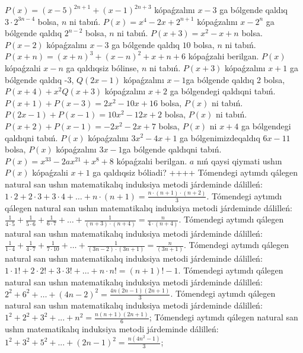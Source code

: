 \(P(x) = (x - 5)^{2n + 1} + (x - 1)^{2n + 3}\) kópaǵzalını \(x - 3\) ga bólgende qaldıq \(3 \cdot 2^{3n - 4}\) bolsa, \(n\) ni tabıń.
\(P(x) = x^{4} - 2x + 2^{n + 1}\) kópaǵzalını \(x - 2^{n}\) ga bólgende qaldıq \(2^{n - 2}\) bolsa, \(n\) ni tabıń.
\(P(x + 3) = x^{2} - x + n\) bolsa. \(P(x - 2)\) kópaǵzalını \(x - 3\) ga bólgende qaldıq \(10\) bolsa, \(n\) ni tabıń.
\(P(x + n) = (x + n)^{3} + (x - n)^{2} + x + n + 6\) kópaǵzalıi berilgan. \(P(x)\) kópaǵzalıi \(x - n\) ga qaldıqsiz bólinse, \(n\) ni tabıń.
\(P(x + 3)\) kópaǵzalını \(x + 1\) ga bólgende qaldıq -3, \(Q(2x - 1)\) kópaǵzalını \(x - 1\)ga bólgende qaldıq 2 bolsa, \(P(x + 4) + x^{2}Q(x + 3)\) kópaǵzalını \(x + 2\) ga bólgendegi qaldıqni tabıń.
\(P(x + 1) + P(x - 3) = 2x^{2} - 10x + 16\) bolsa, \(P(x)\) ni tabıń.
\(P(2x - 1) + P(x - 1) = 10x^{2} - 12x + 2\) bolsa, \(P(x)\) ni tabıń.
\(P(x + 2) + P(x - 1) = - 2x^{2} - 2x + 7\) bolsa, \(P(x)\) ni \(x + 4\) ga bólgendegi qaldıqni tabıń.
\(P(x)\) kópaǵzalını \(3x^{2} - 4x + 1\) ga bólgenimizdeqaldıq \(6x - 11\) bolsa, \(P(x)\) kópaǵzalını \(3x - 1\)ga bólgende qaldıqni tabıń.
\(P(x) = x^{33} - 2ax^{21} + x^{8} + 8\) kópaǵzalıi berilgan. \(a\) nıń qaysi qiymati ushın \(P(x)\) kópaǵzalıi \(x + 1\) ga qaldıqsiz bóliadi?
++++
Tómendegi aytımdı qálegen natural san ushın matematikalıq induksiya metodi járdeminde dálilleń: \(1 \cdot 2 + 2 \cdot 3 + 3 \cdot 4 + \ldots + n \cdot (n + 1) = \frac{n \cdot (n + 1) \cdot (n + 2)}{3}\).
Tómendegi aytımdı qálegen natural san ushın matematikalıq induksiya metodi járdeminde dálilleń: \(\frac{1}{4 \cdot 5} + \frac{1}{5 \cdot 6} + \frac{1}{6 \cdot 7} + \ldots + \frac{1}{(n + 3) \cdot (n + 4)} = \frac{n}{4 \cdot (n + 4)}\).
Tómendegi aytımdı qálegen natural san ushın matematikalıq induksiya metodi járdeminde dálilleń: \(\frac{1}{1 \cdot 4} + \frac{1}{4 \cdot 7} + \frac{1}{7 \cdot 10} + \ldots + \frac{1}{(3n - 2) \cdot (3n + 1)} = \frac{n}{(3n + 1)}\).
Tómendegi aytımdı qálegen natural san ushın matematikalıq induksiya metodi járdeminde dálilleń: \(1 \cdot 1! + 2 \cdot 2! + 3 \cdot 3! + \ldots + n \cdot n! = (n + 1)! - 1\).
Tómendegi aytımdı qálegen natural san ushın matematikalıq induksiya metodi járdeminde dálilleń: \(2^{2} + 6^{2} + \ldots + (4n - 2)^{2} = \frac{4n(2n - 1)(2n + 1)}{3}\).
Tómendegi aytımdı qálegen natural san ushın matematikalıq induksiya metodi járdeminde dálilleń: \(1^{2} + 2^{2} + 3^{2} + ... + n^{2} = \frac{n(n + 1)(2n + 1)}{6}\);
Tómendegi aytımdı qálegen natural san ushın matematikalıq induksiya metodi járdeminde dálilleń: \(1^{2} + 3^{2} + 5^{2} + ... + (2n - 1)^{2} = \frac{n\left( 4n^{2} - 1 \right)}{3}\);
